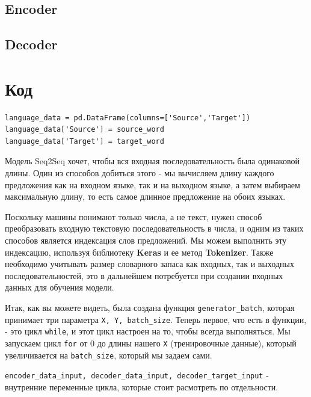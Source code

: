     \clearpage
	
	\subsection{Encoder}
	
	\clearpage
	
	\subsection{Decoder}
	
	\clearpage
	
	\section{Код}
	
	\begin{verbatim}
language_data = pd.DataFrame(columns=['Source','Target'])
language_data['Source'] = source_word
language_data['Target'] = target_word
	\end{verbatim}
	
	Модель Seq2Seq хочет, чтобы вся входная последовательность была одинаковой длины. Один из способов добиться этого - мы вычисляем длину каждого предложения как на входном языке, так и на выходном языке, а затем выбираем максимальную длину, то есть самое длинное предложение на обоих языках. 
	
	Поскольку машины понимают только числа, а не текст, нужен способ преобразовать входную текстовую последовательность в числа, и одним из таких способов является индексация слов предложений. Мы можем выполнить эту индексацию, используя библиотеку \textbf{Keras} и ее метод \textbf{Tokenizer}. Также необходимо учитывать размер словарного запаса как входных, так и выходных последовательностей, это в дальнейшем потребуется при создании входных данных для обучения модели.

    Итак, как вы можете видеть, была создана функция \texttt{generator_batch}, которая принимает три параметра \texttt{X, Y, batch_size}. Теперь первое, что есть в функции, - это цикл \texttt{while}, и этот цикл настроен на то, чтобы всегда выполняться. Мы запускаем цикл \texttt{for} от 0 до длины нашего \texttt{X} (тренировочные данные), который увеличивается на \texttt{batch_size}, который мы задаем сами. 
    
    \texttt{encoder_data_input, decoder_data_input, decoder_target_input} - внутренние переменные цикла, которые стоит расмотреть по отдельности. 
	
